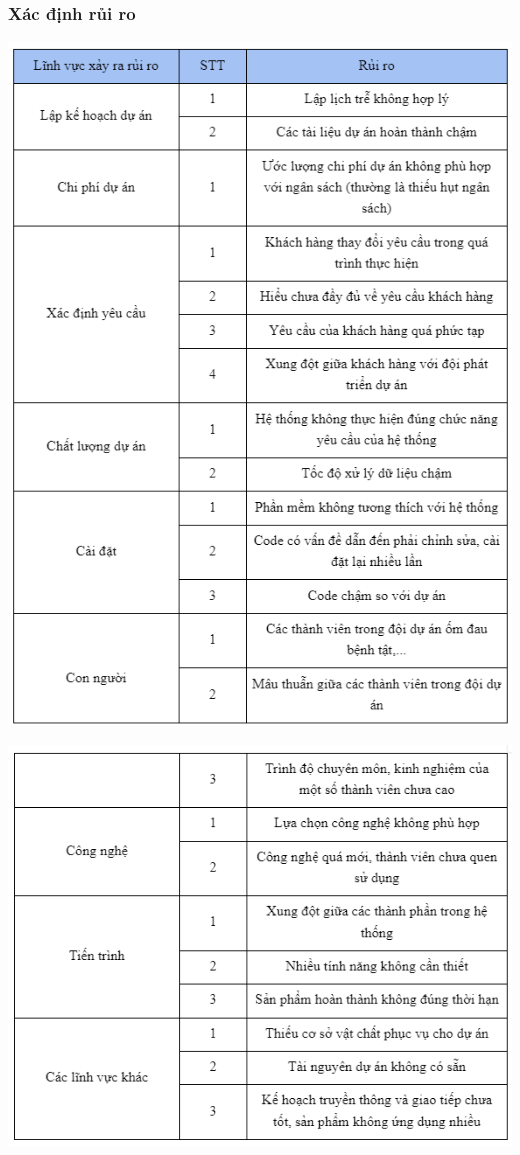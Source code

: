 \documentclass[12pt]{article}
\begin{document}
\subsubsection{Xác định rủi ro}
\includegraphics[width=15cm]{II_7_3_1.png}
\par
\hspace{-0.6cm}\includegraphics[width=15cm]{II_7_3_2.png}
\vspace{0.5cm}
\end{document}
